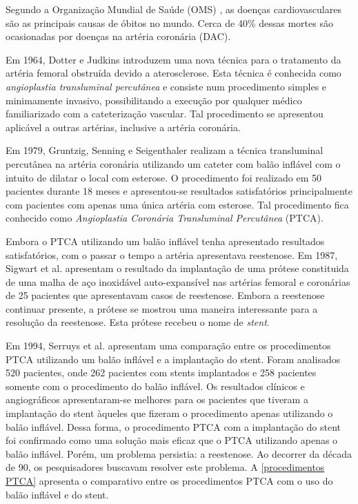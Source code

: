 Segundo a Organização Mundial de Saúde (OMS) \cite{oms},
as doenças cardiovasculares são as principais
causas de óbitos no mundo. Cerca de 40\% dessas
mortes são ocasionadas por doenças na artéria
coronária (DAC). 

\medskip
Em 1964, Dotter e Judkins \cite{dotter1964} introduzem uma nova técnica para o tratamento
da artéria femoral obstruída devido a aterosclerose. Esta técnica é
conhecida como \textit{angioplastia transluminal percutânea} e consiste num
procedimento simples e minimamente invasivo, possibilitando a execução por qualquer 
médico familiarizado com a cateterização vascular. Tal procedimento se apresentou 
aplicável a outras artérias, inclusive a artéria coronária.

\medskip
Em 1979, Gruntzig, Senning e Seigenthaler \cite{gruntzig1979} realizam a técnica transluminal percutânea na artéria
coronária utilizando um cateter com balão inflável com o intuito de dilatar o local
com esterose. O procedimento foi realizado em 50 pacientes durante 18 meses e
apresentou-se resultados satisfatórios principalmente com pacientes com apenas
uma única artéria com esterose. Tal procedimento fica conhecido como \textit{Angioplastia Coronária
Transluminal Percutânea} (PTCA). 

\medskip
Embora o PTCA utilizando um balão inflável tenha apresentado resultados satisfatórios,
com o passar o tempo a artéria apresentava reestenose. Em 1987, Sigwart et al. \cite{sigwart1987}
apresentam o resultado da implantação de uma prótese constituida de uma malha de aço 
inoxidável auto-expansível nas artérias femoral e coronárias de 25 pacientes que apresentavam 
casos de reestenose. Embora a reestenose continuar presente, a prótese se mostrou uma
maneira interessante para a resolução da reestenose. Esta prótese recebeu o nome de \textit{stent}.

\medskip
Em 1994, Serruys et al. \cite{serruys1994} apresentam uma comparação entre os procedimentos PTCA 
utilizando um balão inflável e a implantação do stent. Foram analisados 520 pacientes,
onde 262 pacientes com stents implantados e 258 pacientes somente com o procedimento do
balão inflável. Os resultados clínicos e angiográficos apresentaram-se melhores para os
pacientes que tiveram a implantação do stent àqueles que fizeram o procedimento apenas
utilizando o balão inflável. Dessa forma, o procedimento PTCA com a implantação do stent
foi confirmado como uma solução mais eficaz que o PTCA utilizando apenas o balão inflável. 
Porém, um problema persistia: a reestenose. Ao decorrer da década de 90, os pesquisadores 
buscavam resolver este problema. A \ref{procedimentos PTCA} apresenta o comparativo entre
os procedimentos PTCA com o uso do balão inflável e do stent.

